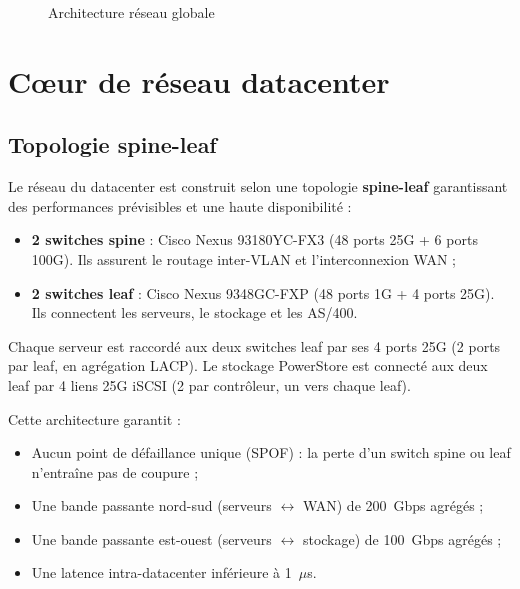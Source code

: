\documentclass[12pt,a4paper]{report}
\begin{document}
\begin{figure}[H]
\caption{Architecture réseau globale}
\label{fig:archi_reseau}
\end{figure}

\section{C\oe ur de réseau datacenter}

\subsection{Topologie spine-leaf}

Le réseau du datacenter est construit selon une topologie \textbf{spine-leaf} garantissant des performances prévisibles et une haute disponibilité :

\begin{itemize}
\item \textbf{2 switches spine} : Cisco Nexus 93180YC-FX3 (48 ports 25G + 6 ports 100G). Ils assurent le routage inter-VLAN et l'interconnexion WAN ;
\item \textbf{2 switches leaf} : Cisco Nexus 9348GC-FXP (48 ports 1G + 4 ports 25G). Ils connectent les serveurs, le stockage et les AS/400.
\end{itemize}

Chaque serveur est raccordé aux deux switches leaf par ses 4 ports 25G (2 ports par leaf, en agrégation LACP). Le stockage PowerStore est connecté aux deux leaf par 4 liens 25G iSCSI (2 par contrôleur, un vers chaque leaf).

Cette architecture garantit :
\begin{itemize}
\item Aucun point de défaillance unique (SPOF) : la perte d'un switch spine ou leaf n'entraîne pas de coupure ;
\item Une bande passante nord-sud (serveurs $\leftrightarrow$ WAN) de 200~Gbps agrégés ;
\item Une bande passante est-ouest (serveurs $\leftrightarrow$ stockage) de 100~Gbps agrégés ;
\item Une latence intra-datacenter inférieure à 1~$\mu$s.
\end{itemize}
\end{document}
